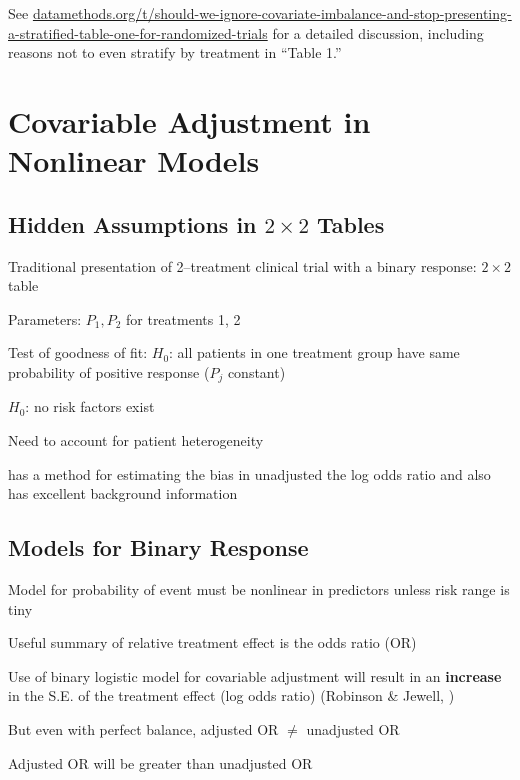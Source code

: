 \begin{sloppypar}
See
\href{https://datamethods.org/t/should-we-ignore-covariate-imbalance-and-stop-presenting-a-stratified-table-one-for-randomized-trials}{\url{datamethods.org/t/should-we-ignore-covariate-imbalance-and-stop-presenting-a-stratified-table-one-for-randomized-trials}}
for a detailed discussion, including reasons not to even stratify by
treatment in ``Table 1.''
\end{sloppypar}

\section{Covariable Adjustment in Nonlinear Models}
\subsection{Hidden Assumptions in $2 \times 2$ Tables}
\bi
\item   Traditional presentation of 2--treatment clinical trial with a binary response: $2 \times 2$ table
\item   Parameters: $P_{1}, P_{2}$ for treatments 1, 2
\item   Test of goodness of fit: $H_0$: all patients in one treatment group have same probability of positive response ($P_j$ constant)
\item   \ra $H_0$: no risk factors exist
\item   Need to account for patient heterogeneity
\item   \cite{mat15inc} has a method for estimating the bias in unadjusted the log odds ratio and also has excellent background information
\ei

\subsection{Models for Binary Response}
\bi
\item   Model for probability of event must be nonlinear in predictors unless risk range is tiny
\item   Useful summary of relative treatment effect is the odds ratio (OR)
\item   Use of binary logistic model for covariable adjustment will result in an {\bf increase} in the S.E. of the treatment effect (log odds ratio) (Robinson \& Jewell, \cite{rob91som})
\item   But even with perfect balance, adjusted OR $\neq$ unadjusted OR
\item   Adjusted OR will be greater than unadjusted OR
\ei

